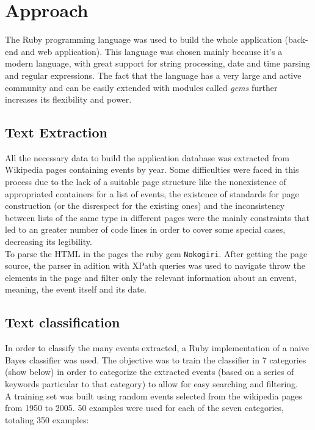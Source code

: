\documentclass{llncs}
\begin{document}
\section{Approach}
\label{sec:approach}

The Ruby programming language was used to build the whole application (back-end and web application). This language was chosen mainly because it's a modern language, with great support for string processing, date and time parsing and regular expressions. The fact that the language has a very large and active community and can be easily extended with modules called \textit{gems} further increases its flexibility and power.

\subsection{Text Extraction}
All the necessary data to build the application database was extracted from Wikipedia pages containing events by year.
Some difficulties were faced in this process due to the lack of a suitable page structure like the nonexistence of appropriated containers for a list of events, the existence of standards for page construction (or the disrespect for the existing ones) and the inconsistency between lists of the same type in different pages were the mainly constraints that led to an greater number of code lines in order to cover some special cases, decreasing its legibility.\\
To parse the HTML in the pages the ruby gem \verb!Nokogiri!. After getting the page source, the parser in adition with XPath queries was used to navigate throw the elements in the page and filter only the relevant information about an envent, meaning, the event itself and its date.


\subsection{Text classification}
\label{subsec:approach:text-classification}

In order to classify the many events extracted, a Ruby implementation of a naive Bayes classifier\cite{classifier} was used. The objective was to train the classifier in 7 categories (show below) in order to categorize the extracted events (based on a series of keywords particular to that category) to allow for easy searching and filtering.\\

A training set was built using random events selected from the wikipedia pages from 1950 to 2005. 50 examples were used for each of the seven categories, totaling 350 examples:
\end{document}
